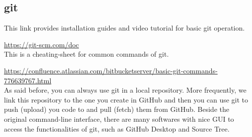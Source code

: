 \documentclass[12pt, fullpage,letterpaper]{article}
\begin{document}
\subsection*{git}


This link provides installation guides and video tutorial for basic git operation.

\href{https://git-scm.com/doc}{https://git-scm.com/doc}\\

This is a cheating-sheet for common commands of git.

\href{https://confluence.atlassian.com/bitbucketserver/basic-git-commands-776639767.html}{https://confluence.atlassian.com/bitbucketserver/basic-git-commands-776639767.html}\\

As said before, you can always use git in a local repository. More frequently, we link this repository to the one you create in GitHub and then you can use git to push (upload) you code to and pull (fetch) them from GitHub. Beside the original command-line interface, there are many softwares with nice GUI to access the functionalities of git, such as GitHub Desktop and Source Tree. 
\end{document}
